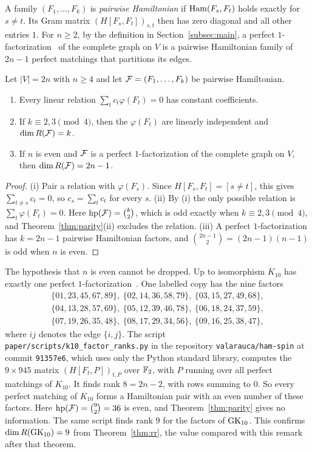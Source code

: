 A family $(F_1,\dots,F_k)$ is \emph{pairwise Hamiltonian} if $\operatorname{Ham}(F_s,F_t)$ holds exactly for $s\ne t$. Its Gram matrix ${(H[F_s,F_t])}_{s,t}$ then has zero diagonal and all other entries $1$. For $n\ge2$, by the definition in Section~\ref{subsec:main}, a perfect $1$-factorization~\cite{Kotzig64} of the complete graph on $V$ is a pairwise Hamiltonian family of $2n-1$ perfect matchings that partitions its edges.

\begin{theorem}\label{thm:kotzig}
Let $|V|=2n$ with $n\ge4$ and let $\mathcal{F}=(F_1,\dots,F_k)$ be pairwise Hamiltonian.
\begin{enumerate}
\item Every linear relation $\sum_{t}c_t\varphi(F_t)=0$ has constant coefficients.
\item If $k\equiv2,3\pmod4$, then the $\varphi(F_t)$ are linearly independent and $\dim R(\mathcal{F})=k$.
\item If $n$ is even and $\mathcal{F}$ is a perfect $1$-factorization of the complete graph on $V$, then $\dim R(\mathcal{F})=2n-1$.
\end{enumerate}
\end{theorem}

\begin{proof}
(i) Pair a relation with $\varphi(F_s)$. Since $H[F_s,F_t]=[s\ne t]$, this gives $\sum_{t\ne s}c_t=0$, so $c_s=\sum_{t}c_t$ for every $s$. (ii) By (i) the only possible relation is $\sum_t\varphi(F_t)=0$. Here $\operatorname{hp}(\mathcal{F})=\binom k2$, which is odd exactly when $k\equiv2,3\pmod4$, and Theorem~\ref{thm:parity}(ii) excludes the relation. (iii) A perfect $1$-factorization has $k=2n-1$ pairwise Hamiltonian factors, and $\binom{2n-1}2=(2n-1)(n-1)$ is odd when $n$ is even.
\end{proof}

\begin{remark}\label{rem:K10}
The hypothesis that $n$ is even cannot be dropped. Up to isomorphism $K_{10}$ has exactly one perfect $1$-factorization~\cite[Introduction]{DG96}. One labelled copy has the nine factors
\begin{gather*}
\{01,23,45,67,89\},\ \{02,14,36,58,79\},\ \{03,15,27,49,68\},\\
\{04,13,28,57,69\},\ \{05,12,39,46,78\},\ \{06,18,24,37,59\},\\
\{07,19,26,35,48\},\ \{08,17,29,34,56\},\ \{09,16,25,38,47\},
\end{gather*}
where $ij$ denotes the edge $\{i,j\}$. The script \texttt{paper/\allowbreak{}scripts/\allowbreak{}k10\_factor\_ranks.py} in the repository \texttt{valarauca/ham-spin} at commit \texttt{91357e6}, which uses only the Python standard library, computes the $9\times945$ matrix ${(H[F_t,P])}_{t,P}$ over $\mathbb{F}_2$, with $P$ running over all perfect matchings of $K_{10}$. It finds rank $8=2n-2$, with rows summing to $0$. So every perfect matching of $K_{10}$ forms a Hamiltonian pair with an even number of these factors. Here $\operatorname{hp}(\mathcal{F})=\binom92=36$ is even, and Theorem~\ref{thm:parity} gives no information. The same script finds rank $9$ for the factors of $\mathrm{GK}_{10}$. This confirms $\dim R(\mathrm{GK}_{10})=9$ from Theorem~\ref{thm:rr}, the value compared with this remark after that theorem.
\end{remark}
